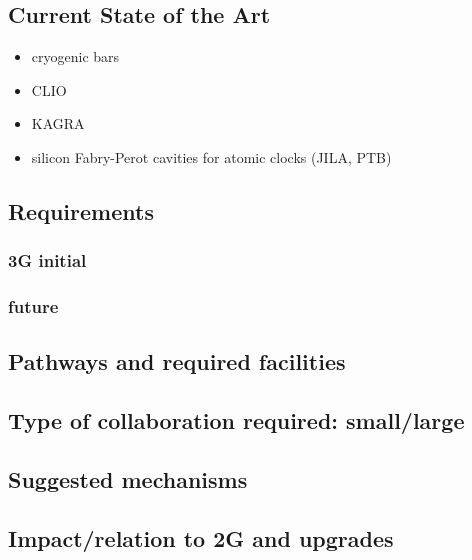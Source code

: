 \subsection{Current State of the Art}
\begin{itemize}
\item cryogenic bars
\item CLIO
\item KAGRA
\item silicon Fabry-Perot cavities for atomic clocks (JILA, PTB)
\end{itemize}
\subsection{Requirements}
\subsubsection{3G initial}
\subsubsection{future}
\subsection{Pathways and required facilities}
\subsection{Type of collaboration required:  small/large}
\subsection{Suggested mechanisms}
\subsection{Impact/relation to 2G and upgrades}